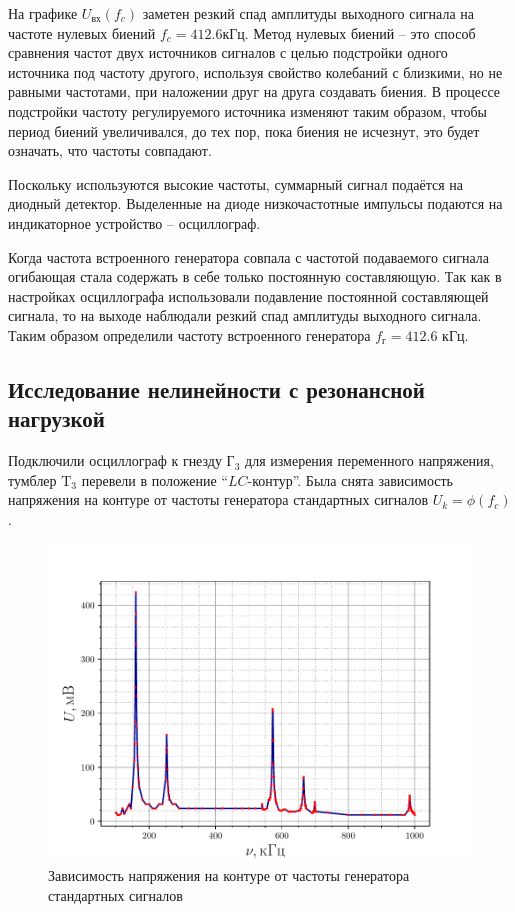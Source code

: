 На графике $U_\text{вх}(f_c)$ заметен резкий спад амплитуды выходного сигнала на частоте нулевых биений $f_c=412.6\text{кГц}$. Метод нулевых биений -- это способ сравнения частот двух источников сигналов с целью подстройки одного источника под частоту другого, используя свойство колебаний с близкими, но не равными частотами, при наложении друг на друга создавать биения. В процессе подстройки частоту регулируемого источника изменяют таким образом, чтобы период биений увеличивался, до тех пор, пока биения не исчезнут, это будет означать, что частоты совпадают. 

Поскольку используются высокие частоты, суммарный сигнал подаётся на диодный детектор. Выделенные на диоде низкочастотные импульсы подаются на индикаторное устройство -- осциллограф.

Когда частота встроенного генератора совпала с частотой подаваемого сигнала огибающая стала содержать в себе только постоянную составляющую. Так как в настройках осциллографа использовали подавление постоянной составляющей сигнала, то на выходе наблюдали резкий спад амплитуды выходного сигнала. Таким образом определили частоту встроенного генератора $f_\text{г}=412.6\text{ кГц}$.

\subsection{Исследование нелинейности с резонансной нагрузкой}
Подключили осциллограф к гнезду $\text{Г}_3$ для измерения переменного напряжения,
тумблер $\text{T}_3$ перевели в положение “$LC$-контур”.
Была снята зависимость напряжения на контуре от частоты генератора стандартных сигналов $U_k=\phi(f_c)$.
\begin{figure}[h!]
	\centering
	\includegraphics[width=\textwidth]{fig/exp2.pdf}
	\caption{Зависимость напряжения на контуре от частоты генератора стандартных сигналов}
	\label{exp:2}
\end{figure}

